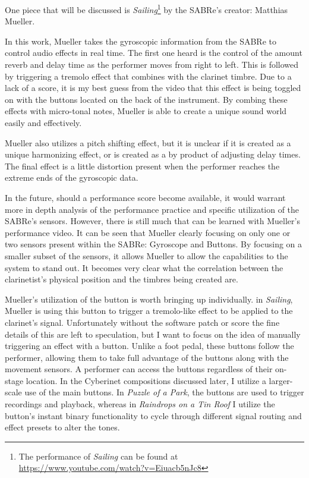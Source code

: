 One piece that will be discussed is  \textit{Sailing}\footnote{The performance of \textit{Sailing} can be found at \url{https://www.youtube.com/watch?v=Eiuacb5nJc8}} by the SABRe's creator: Matthias Mueller.  

In this work, Mueller takes the gyroscopic information from the SABRe to control audio effects in real time. The first one heard is the control of the amount reverb and delay time as the performer moves from right to left. This is followed by triggering a tremolo effect that combines with the clarinet timbre. Due to a lack of a score, it is my best guess from the video that this effect is being toggled on with the buttons located on the back of the instrument. By combing these effects with micro-tonal notes, Mueller is able to create a unique sound world easily and effectively.

Mueller also utilizes a pitch shifting effect, but it is unclear if it is created as a unique harmonizing effect, or is created as a by product of adjusting delay times. The final effect is a little distortion present when the performer reaches the extreme ends of the gyroscopic data.

In the future, should a performance score become available, it would warrant more in depth analysis of the performance practice and specific utilization of the SABRe's sensors. However, there is still much that can be learned with Mueller's performance video. It can be seen that Mueller clearly focusing on only one or two sensors present within the SABRe: Gyroscope and Buttons. By focusing on a smaller subset of the sensors, it allows Mueller to allow the capabilities to the system to stand out. It becomes very clear what the correlation between the clarinetist's physical position and the timbres being created are.

Mueller's utilization of the button is worth bringing up individually. in \textit{Sailing}, Mueller is using this button to trigger a tremolo-like effect to be applied to the clarinet's signal. Unfortunately without the software patch or score the fine details of this are left to speculation, but I want to focus on the idea of manually triggering an effect with a button. Unlike a foot pedal, these buttons follow the performer, allowing them to take full advantage of the buttons along with the movement sensors. A performer can access the buttons regardless of their on-stage location. In the Cyberinet compositions discussed later, I utilize a larger-scale use of the main buttons. In \textit{Puzzle of a Park}, the buttons are used to trigger recordings and playback, whereas in \textit{Raindrops on a Tin Roof} I utilize the button's instant binary functionality to cycle through different signal routing and effect presets to alter the tones.


